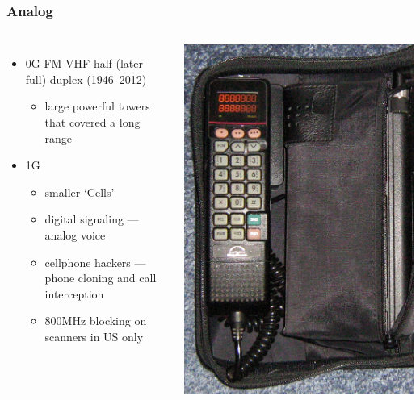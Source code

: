 \documentclass{beamer}
\begin{document}
\begin{frame}
  \frametitle{Analog}
  \begin{columns}[c]
  \begin{itemize}
    \item 0G FM VHF half (later full) duplex (1946--2012)
    \begin{itemize}
      \item large powerful towers that covered a long range
    \end{itemize}
    \item 1G
    \begin{itemize}
      \item smaller `Cells'
      \item digital signaling --- analog voice
      \item cellphone hackers --- phone cloning and call interception
      \item 800MHz blocking on scanners in US only
    \end{itemize}
  \end{itemize}
  \includegraphics[width=.8\textwidth]{Motorola2950}

\end{columns}
\end{frame}
\end{document}
